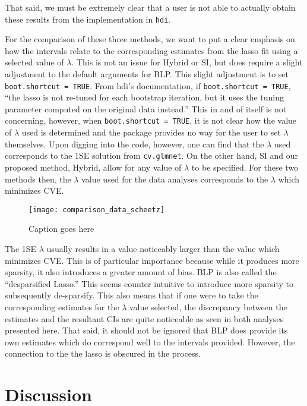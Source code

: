 That said, we must be extremely clear that a user is not able to actually obtain these results from the implementation in \texttt{hdi}.

For the comparison of these three methods, we want to put a clear emphasis on how the intervals relate to the corresponding estimates from the lasso fit using a selected value of $\lambda$. This is not an issue for Hybrid or SI, but does require a slight adjustment to the default arguments for BLP. This slight adjustment is to set \texttt{boot.shortcut = TRUE}. From hdi's documentation, if \texttt{boot.shortcut = TRUE}, ``the lasso is not re-tuned for each bootstrap iteration, but it uses the tuning parameter computed on the original data instead.'' This in and of itself is not concerning, however, when \texttt{boot.shortcut = TRUE}, it is not clear how the value of $\lambda$ used is determined and the package provides no way for the user to set $\lambda$ themselves. Upon digging into the code, however, one can find that the $\lambda$ used corresponds to the 1SE solution from \texttt{cv.glmnet}. On the other hand, SI and our proposed method, Hybrid, allow for any value of $\lambda$ to be specified. For these two methods then, the $\lambda$ value used for the data analyses corresponds to the $\lambda$ which minimizes CVE.

\begin{figure}[hbtp]
  \texttt{[image: comparison\_data\_scheetz]}
  \caption{\label{Fig:comparison_data_scheetz} Caption goes here}
\end{figure}

The 1SE $\lambda$ usually results in a value noticeably larger than the value which minimizes CVE. This is of particular importance because while it produces more sparsity, it also introduces a greater amount of bias. BLP is also called the ``desparsified Lasso.'' This seems counter intuitive to introduce more sparsity to subsequently de-sparsify. This also means that if one were to take the corresponding estimates for the $\lambda$ value selected, the discrepancy between the estimates and the resultant CIs are quite noticeable as seen in both analyses presented here. That said, it should not be ignored that BLP does provide its own estimates which do correspond well to the intervals provided. However, the connection to the the lasso is obscured in the process.

\section{Discussion}

